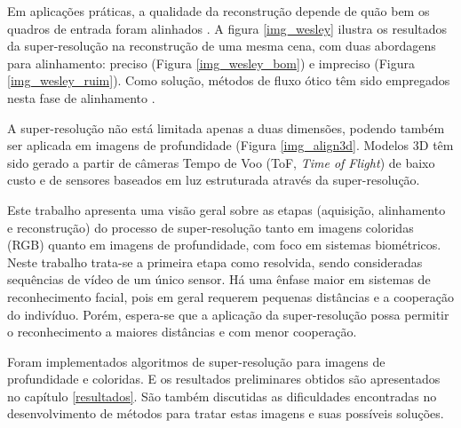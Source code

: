 Em aplicações práticas, a qualidade da reconstrução depende de quão bem os
quadros de entrada foram alinhados \cite{howtobreak}. A figura \ref{img_wesley}
ilustra os resultados da super-resolução na reconstrução de uma mesma cena, com
duas abordagens para alinhamento: preciso (Figura
\ref{img_wesley_bom}) e impreciso (Figura \ref{img_wesley_ruim}).
Como solução, métodos de fluxo ótico \cite{lukaskanade, hornschunck} têm sido
empregados nesta fase de alinhamento \cite{bakerkanade99}.


A super-resolução não está limitada apenas a duas dimensões, podendo também ser
aplicada em imagens de profundidade \cite{rosenbush} (Figura \ref{img_align3d}.
Modelos 3D têm sido gerado a partir de câmeras Tempo de Voo (ToF, \textit{Time
of Flight}) de baixo custo \cite{schuon2009, gevrekci, cui2010} e de sensores
baseados em luz estruturada \cite{cui2011} através da super-resolução.

Este trabalho apresenta uma visão geral sobre as etapas (aquisição, alinhamento
e reconstrução) do processo de super-resolução tanto em imagens coloridas (RGB)
quanto em imagens de profundidade, com foco em sistemas biométricos. Neste
trabalho trata-se a primeira etapa como resolvida, sendo consideradas
sequências de vídeo de um único sensor.  Há uma ênfase maior em sistemas de
reconhecimento facial, pois em geral requerem pequenas distâncias e a
cooperação do indivíduo. Porém, espera-se que a aplicação da super-resolução
possa permitir o reconhecimento a maiores distâncias e com menor cooperação.

Foram implementados algoritmos de super-resolução para imagens de profundidade
e coloridas. E os resultados preliminares obtidos são apresentados no capítulo
\ref{resultados}. São também discutidas as dificuldades encontradas no
desenvolvimento de métodos para tratar estas imagens e suas possíveis soluções.
